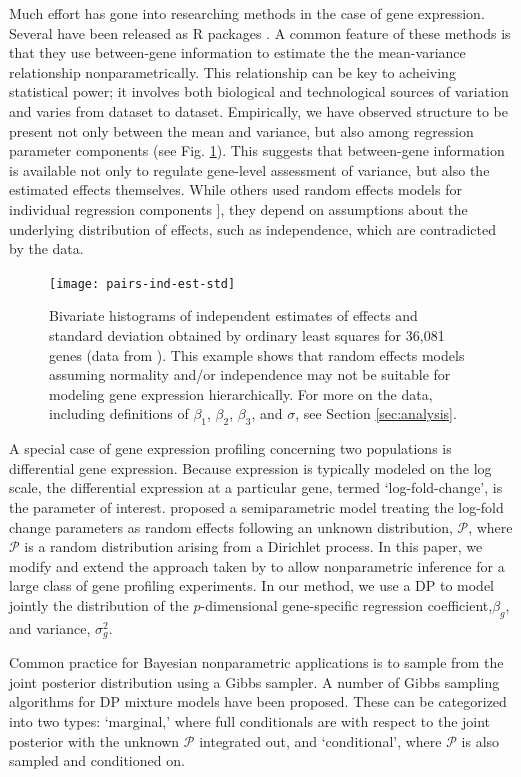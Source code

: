 Much effort has gone into researching methods in the case of gene expression. Several have been released as R packages \citep{edger2010,deseq2014,voom}. A common feature of these methods is that they use between-gene information to estimate the the  mean-variance relationship nonparametrically. This relationship can be key to acheiving statistical power; it involves both biological and technological sources of variation and varies from dataset to dataset\cite{voom}. Empirically, we have observed structure to be present not only between the mean and variance, but also among regression parameter components (see Fig. \ref{pairs-ind-est}). This suggests that between-gene information is available not only to regulate gene-level assessment of variance, but also the estimated effects themselves. While others used random effects models for individual regression components \citep{deseq2014,landau}], they depend on assumptions about the underlying distribution of effects, such as independence, which are contradicted by the data.

\begin{figure}[ht]
\centering
\texttt{[image: pairs-ind-est-std]}
\caption{Bivariate histograms of independent estimates of effects and standard deviation obtained by ordinary least squares for 36,081 genes (data from \cite{paschold}). This example shows that random effects models assuming normality and/or independence may not be suitable for modeling gene expression hierarchically. For more on the data, including definitions of $\beta_1$, $\beta_2$, $\beta_3$, and $\sigma$, see Section \ref{sec:analysis}.}
\label{pairs-ind-est}
\end{figure}

A special case of gene expression profiling concerning two populations is differential gene expression. Because expression is typically modeled on the log scale, the differential expression at a particular gene, termed `log-fold-change', is the parameter of interest. \citet{liu} proposed a semiparametric model treating the log-fold change parameters as random effects following an unknown distribution, $\mathcal{P}$, where $\mathcal{P}$ is a random distribution arising from a Dirichlet process. In this paper, we modify and extend the approach taken by \cite{liu} to allow nonparametric inference for a large class of gene profiling experiments. In our method, we use a DP to model jointly the distribution of the $p$-dimensional gene-specific regression coefficient,$\beta_g$, and variance, $\sigma^2_g$.

Common practice for Bayesian nonparametric applications is to sample from the joint posterior distribution using a Gibbs sampler. A number of Gibbs sampling algorithms for DP mixture models have been proposed. These can be categorized into two types: `marginal,' where full conditionals are with respect to the joint posterior with the unknown $\mathcal{P}$ integrated out, and `conditional', where $\mathcal{P}$ is also sampled and conditioned on.

